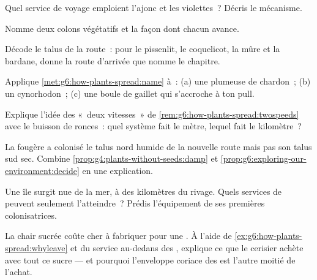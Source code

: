 \begin{exercise}[$\star$]\label{exo:g6:how-plants-spread:5}
Quel service de voyage emploient l'ajonc et les violettes~? Décris
le mécanisme.
\end{exercise}

\begin{exercise}[$\star$]\label{exo:g6:how-plants-spread:6}
Nomme deux colons végétatifs et la façon dont chacun avance.
\end{exercise}

\begin{exercise}[$\star\star$]\label{exo:g6:how-plants-spread:7}
Décode le talus de la route~: pour le pissenlit, le coquelicot, la
mûre et la bardane, donne la route d'arrivée que nomme le chapitre.
\end{exercise}

\begin{exercise}[$\star\star$]\label{exo:g6:how-plants-spread:8}
Applique \cref{met:g6:how-plants-spread:name} à~: (a) une 
plumeuse de chardon~; (b) un cynorhodon~; (c) une boule de gaillet
qui s'accroche à ton pull.
\end{exercise}

\begin{exercise}[$\star\star$]\label{exo:g6:how-plants-spread:9}
Explique l'idée des «~deux vitesses~» de
\cref{rem:g6:how-plants-spread:twospeeds} avec le buisson de
ronces~: quel système fait le mètre, lequel fait le kilomètre~?
\end{exercise}

\begin{exercise}[$\star\star$]\label{exo:g6:how-plants-spread:10}
La fougère a colonisé le talus nord humide de la nouvelle route mais
pas son talus sud sec. Combine
\cref{prop:g4:plants-without-seeds:damp} et
\cref{prop:g6:exploring-our-environment:decide} en une explication.
\end{exercise}

\begin{exercise}[$\star\star$]\label{exo:g6:how-plants-spread:11}
Une île surgit nue de la mer, à des kilomètres du rivage. Quels
services de  peuvent seulement l'atteindre~? Prédis
l'équipement de ses premières  colonisatrices.
\end{exercise}

\begin{exercise}[$\star\star\star$]\label{exo:g6:how-plants-spread:12}
La chair sucrée coûte cher à fabriquer pour une . À l'aide de
\cref{ex:g6:how-plants-spread:whyleave} et du service au-dedans des
, explique ce que le cerisier achète avec tout ce sucre ---
et pourquoi l'enveloppe coriace des  est l'autre moitié de
l'achat.
\end{exercise}

